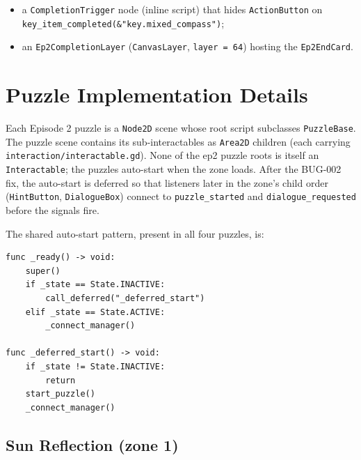 \documentclass[12pt, a4paper]{article}
\begin{document}
\begin{itemize}[nosep]
  \item a \texttt{CompletionTrigger} node (inline script) that hides
        \texttt{ActionButton} on \texttt{key\_item\_completed(\&"key.mixed\_compass")};
  \item an \texttt{Ep2CompletionLayer} (\texttt{CanvasLayer}, \texttt{layer = 64})
        hosting the \texttt{Ep2EndCard}.
\end{itemize}

\section{Puzzle Implementation Details}

Each Episode 2 puzzle is a \texttt{Node2D} scene whose root script subclasses
\texttt{PuzzleBase}. The puzzle scene contains its sub-interactables as
\texttt{Area2D} children (each carrying \texttt{interaction/interactable.gd}).
None of the ep2 puzzle roots is itself an \texttt{Interactable}; the puzzles
auto-start when the zone loads. After the BUG-002 fix, the auto-start is
deferred so that listeners later in the zone's child order
(\texttt{HintButton}, \texttt{DialogueBox}) connect to \texttt{puzzle\_started}
and \texttt{dialogue\_requested} before the signals fire.

The shared auto-start pattern, present in all four puzzles, is:

\begin{lstlisting}
func _ready() -> void:
    super()
    if _state == State.INACTIVE:
        call_deferred("_deferred_start")
    elif _state == State.ACTIVE:
        _connect_manager()

func _deferred_start() -> void:
    if _state != State.INACTIVE:
        return
    start_puzzle()
    _connect_manager()
\end{lstlisting}

\subsection{Sun Reflection (zone 1)}
\end{document}
